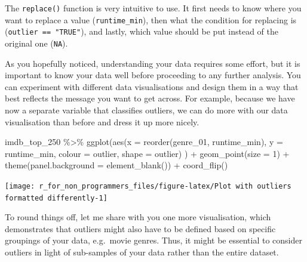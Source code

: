 \documentclass[
]{book}
\newenvironment{Shaded}{\begin{snugshade}}{\end{snugshade}}
\newcommand{\AttributeTok}[1]{\textcolor[rgb]{0.77,0.63,0.00}{#1}}
\newcommand{\DecValTok}[1]{\textcolor[rgb]{0.00,0.00,0.81}{#1}}
\newcommand{\FunctionTok}[1]{\textcolor[rgb]{0.00,0.00,0.00}{#1}}
\newcommand{\NormalTok}[1]{#1}
\newcommand{\SpecialCharTok}[1]{\textcolor[rgb]{0.00,0.00,0.00}{#1}}
\begin{document}
The \texttt{replace()} function is very intuitive to use. It first needs to know where you want to replace a value (\texttt{runtime\_min}), then what the condition for replacing is (\texttt{outlier\ ==\ "TRUE"}), and lastly, which value should be put instead of the original one (\texttt{NA}).

As you hopefully noticed, understanding your data requires some effort, but it is important to know your data well before proceeding to any further analysis. You can experiment with different data visualisations and design them in a way that best reflects the message you want to get across. For example, because we have now a separate variable that classifies outliers, we can do more with our data visualisation than before and dress it up more nicely.

\begin{Shaded}
\begin{Highlighting}[]
\NormalTok{imdb\_top\_250 }\SpecialCharTok{\%\textgreater{}\%} 
  \FunctionTok{ggplot}\NormalTok{(}\FunctionTok{aes}\NormalTok{(}\AttributeTok{x =} \FunctionTok{reorder}\NormalTok{(genre\_01, runtime\_min),}
             \AttributeTok{y =}\NormalTok{ runtime\_min,}
             \AttributeTok{colour =}\NormalTok{ outlier,}
             \AttributeTok{shape =}\NormalTok{ outlier)}
\NormalTok{         ) }\SpecialCharTok{+}
  \FunctionTok{geom\_point}\NormalTok{(}\AttributeTok{size =} \DecValTok{1}\NormalTok{) }\SpecialCharTok{+}
  \FunctionTok{theme}\NormalTok{(}\AttributeTok{panel.background =} \FunctionTok{element\_blank}\NormalTok{()) }\SpecialCharTok{+}
  \FunctionTok{coord\_flip}\NormalTok{()}
\end{Highlighting}
\end{Shaded}

\begin{center}\texttt{[image: r\_for\_non\_programmers\_files/figure-latex/Plot with outliers formatted differently-1]} \end{center}

To round things off, let me share with you one more visualisation, which demonstrates that outliers might also have to be defined based on specific groupings of your data, e.g.~movie genres. Thus, it might be essential to consider outliers in light of sub-samples of your data rather than the entire dataset.
\end{document}
